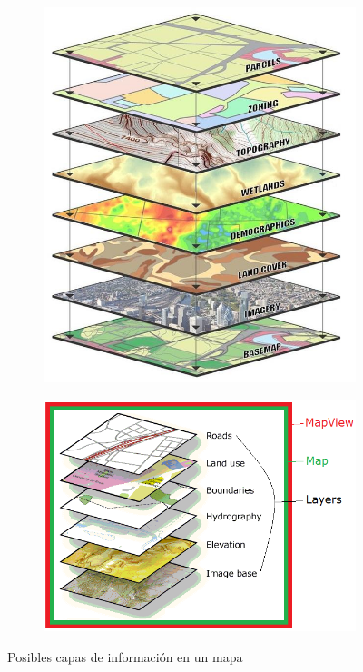 \begin{figure}[H]
	\centering
	\begin{subfigure}[h]{0.36\textwidth} 
		\includegraphics[width=\textwidth]{imagenes/capitulo2/2_capas-mapa-3.jpg}
		\caption{}
	\end{subfigure}       
	\begin{subfigure}[h]{0.56\textwidth} 
		\includegraphics[width=\textwidth]{imagenes/capitulo2/2_capas-mapa-4.png}
		\caption{}
	\end{subfigure}
	\caption{Posibles capas de información en un mapa \cite{ImagenCapasMapas}}
	\label{fig:capas-mapas}
\end{figure}

